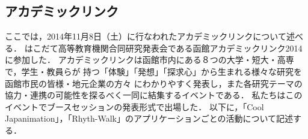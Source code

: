 \subsection{アカデミックリンク}
\par
ここでは，2014年11月8日（土）に行なわれたアカデミックリンクについて述べる．
はこだて高等教育機関合同研究発表会である函館アカデミックリンク2014に参加した．
アカデミックリンクは函館市内にある８つの大学・短大・高専で，学生・教員らが
持つ「体験」「発想」「探求心」から生まれる様々な研究を函館市民の皆様・地元企業の方々
にわかりやすく発表し，また各研究テーマの協力・連携の可能性を探るべく一同に結集するイベントである．
私たちはこのイベントでブースセッションの発表形式で出場した．
以下に，「Cool Japanimation」，「Rhyth-Walk」のアプリケーションごとの活動について記述する．

